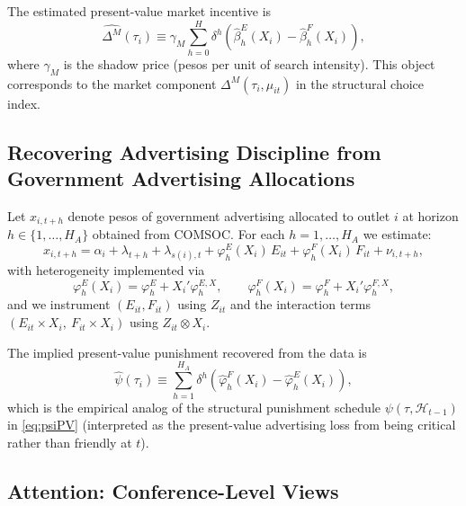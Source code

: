 \documentclass[12pt]{article}
\begin{document}
The estimated present-value market incentive is
\begin{equation}\label{eq:DeltaM_PV}
\widehat{\Delta^{M}}(\tau_i)\equiv \gamma_M \sum_{h=0}^{H}\delta^{h}\left(\widehat{\beta}^{E}_{h}(X_i)-\widehat{\beta}^{F}_{h}(X_i)\right),
\end{equation}
where $\gamma_M$ is the shadow price (pesos per unit of search intensity). This object corresponds to the market component $\Delta^{M}(\tau_i,\mu_{it})$ in the structural choice index.

\subsection{Recovering Advertising Discipline from Government Advertising Allocations}

Let $x_{i,t+h}$ denote pesos of government advertising allocated to outlet $i$ at horizon $h\in\{1,\dots,H_A\}$ obtained from COMSOC. For each $h=1,\dots,H_A$ we estimate:
\[
x_{i,t+h} = \alpha_i + \lambda_{t+h} + \lambda_{s(i),t}
+ \varphi^E_h(X_i)\,E_{it} + \varphi^F_h(X_i)\,F_{it} + \nu_{i,t+h},
\]
with heterogeneity implemented via
\[
\varphi^E_h(X_i)=\varphi^E_h + X_i'\varphi^{E,X}_h,
\qquad 
\varphi^F_h(X_i)=\varphi^F_h + X_i'\varphi^{F,X}_h,
\]
and we instrument $(E_{it},F_{it})$ using $Z_{it}$ and the interaction terms $(E_{it}\times X_i,\ F_{it}\times X_i)$ using $Z_{it}\otimes X_i$.

The implied present-value punishment recovered from the data is
\begin{equation}\label{eq:PsiPV_hat}
\widehat{\psi}(\tau_i)\equiv \sum_{h=1}^{H_A}\delta^{h}\left(\widehat{\varphi}^{F}_{h}(X_i)-\widehat{\varphi}^{E}_{h}(X_i)\right),
\end{equation}
which is the empirical analog of the structural punishment schedule $\psi(\tau,\mathcal{H}_{t-1})$ in \eqref{eq:psiPV} (interpreted as the present-value advertising loss from being critical rather than friendly at $t$).

\subsection{Attention: Conference-Level Views}
\end{document}
